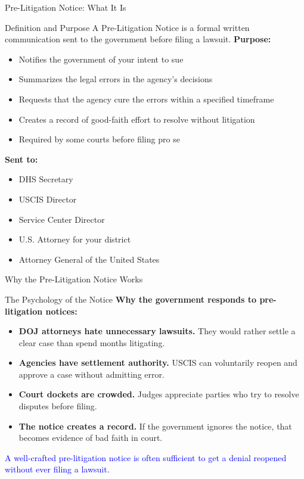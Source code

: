 \documentclass[11pt]{beamer}
\begin{document}
	\begin{frame}{Pre-Litigation Notice: What It Is}
		\scriptsize
		\begin{block}{Definition and Purpose}
			A Pre-Litigation Notice is a formal written communication sent to the government before filing a lawsuit.
			\vspace{0.2cm}
			\textbf{Purpose:}
			\begin{itemize}
				\item Notifies the government of your intent to sue
				\item Summarizes the legal errors in the agency's decisions
				\item Requests that the agency cure the errors within a specified timeframe
				\item Creates a record of good-faith effort to resolve without litigation
				\item Required by some courts before filing pro se
			\end{itemize}
			\textbf{Sent to:}
			\begin{itemize}
				\item DHS Secretary
				\item USCIS Director
				\item Service Center Director
				\item U.S. Attorney for your district
				\item Attorney General of the United States
			\end{itemize}
		\end{block}
	\end{frame}
	
	\begin{frame}{Why the Pre-Litigation Notice Works}
		\scriptsize
		\begin{block}{The Psychology of the Notice}
			\textbf{Why the government responds to pre-litigation notices:}
			\begin{itemize}
				\item \textbf{DOJ attorneys hate unnecessary lawsuits.} They would rather settle a clear case than spend months litigating.
				\item \textbf{Agencies have settlement authority.} USCIS can voluntarily reopen and approve a case without admitting error.
				\item \textbf{Court dockets are crowded.} Judges appreciate parties who try to resolve disputes before filing.
				\item \textbf{The notice creates a record.} If the government ignores the notice, that becomes evidence of bad faith in court.
			\end{itemize}
			\textcolor{blue}{A well-crafted pre-litigation notice is often sufficient to get a denial reopened without ever filing a lawsuit.}
		\end{block}
	\end{frame}
	
\end{document}

